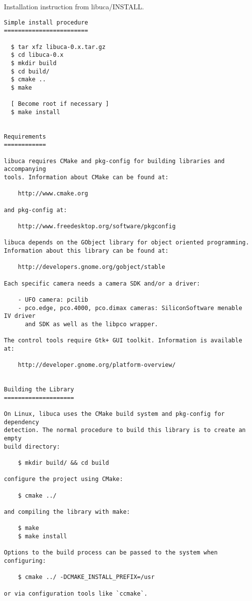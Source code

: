 Installation instruction from libuca/INSTALL.

\begin{verbatim}
Simple install procedure
========================

  $ tar xfz libuca-0.x.tar.gz
  $ cd libuca-0.x
  $ mkdir build
  $ cd build/
  $ cmake ..
  $ make

  [ Become root if necessary ]
  $ make install


Requirements
============

libuca requires CMake and pkg-config for building libraries and accompanying
tools. Information about CMake can be found at:

    http://www.cmake.org

and pkg-config at:

    http://www.freedesktop.org/software/pkgconfig

libuca depends on the GObject library for object oriented programming.
Information about this library can be found at:

    http://developers.gnome.org/gobject/stable

Each specific camera needs a camera SDK and/or a driver:

    - UFO camera: pcilib
    - pco.edge, pco.4000, pco.dimax cameras: SiliconSoftware menable IV driver
      and SDK as well as the libpco wrapper.

The control tools require Gtk+ GUI toolkit. Information is available at:

    http://developer.gnome.org/platform-overview/


Building the Library
====================

On Linux, libuca uses the CMake build system and pkg-config for dependency
detection. The normal procedure to build this library is to create an empty
build directory:

    $ mkdir build/ && cd build

configure the project using CMake:

    $ cmake ../

and compiling the library with make:

    $ make
    $ make install

Options to the build process can be passed to the system when configuring:

    $ cmake ../ -DCMAKE_INSTALL_PREFIX=/usr

or via configuration tools like `ccmake`.
\end{verbatim}


